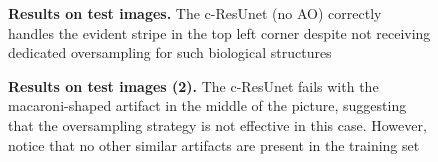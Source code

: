 




\begin{figure}[!b]
\centering
{}
\caption{\textbf{Results on test images.} 
The c-ResUnet (no AO) correctly handles the evident stripe in the top left corner despite not receiving dedicated oversampling for such biological structures
} 
\label{fig:predictions}
\end{figure}
\begin{figure}[ht]\ContinuedFloat
\centering

\caption{\textbf{Results on test images (2).} 
The c-ResUnet fails with the \mbox{macaroni-shaped} artifact in the middle of the picture, suggesting that the oversampling strategy is not effective in this case. However, notice that no other similar artifacts are present in the training set
} 
\end{figure}


